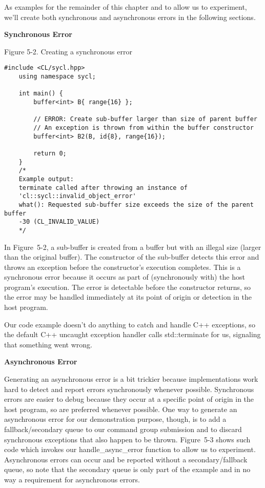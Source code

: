 As examples for the remainder of this chapter and to allow us to experiment, we’ll create both synchronous and asynchronous errors in the following sections.\par

\hspace*{\fill} \par %
\textbf{Synchronous Error}

\hspace*{\fill} \par %
Figure 5-2. Creating a synchronous error
\begin{lstlisting}[caption={}]
	#include <CL/sycl.hpp>
	using namespace sycl;
	
	int main() {
		buffer<int> B{ range{16} };
		
		// ERROR: Create sub-buffer larger than size of parent buffer
		// An exception is thrown from within the buffer constructor
		buffer<int> B2(B, id{8}, range{16});
		
		return 0;
	}
	/*
	Example output:
	terminate called after throwing an instance of 
	'cl::sycl::invalid_object_error'
	what(): Requested sub-buffer size exceeds the size of the parent buffer 
	-30 (CL_INVALID_VALUE)
	*/
\end{lstlisting}

In Figure 5-2, a sub-buffer is created from a buffer but with an illegal size (larger than the original buffer). The constructor of the sub-buffer detects this error and throws an exception before the constructor’s execution completes. This is a synchronous error because it occurs as part of (synchronously with) the host program’s execution. The error is detectable before the constructor returns, so the error may be handled immediately at its point of origin or detection in the host program.\par

Our code example doesn’t do anything to catch and handle C++ exceptions, so the default C++ uncaught exception handler calls std::terminate for us, signaling that something went wrong.\par

\hspace*{\fill} \par %
\textbf{Asynchronous Error}

Generating an asynchronous error is a bit trickier because implementations work hard to detect and report errors synchronously whenever possible. Synchronous errors are easier to debug because they occur at a specific point of origin in the host program, so are preferred whenever possible. One way to generate an asynchronous error for our demonstration purpose, though, is to add a fallback/secondary queue to our command group submission and to discard synchronous exceptions that also happen to be thrown. Figure 5-3 shows such code which invokes our handle\_async\_error function to allow us to experiment. Asynchronous errors can occur and be reported without a secondary/fallback queue, so note that the secondary queue is only part of the example and in no way a requirement for asynchronous errors.\par

